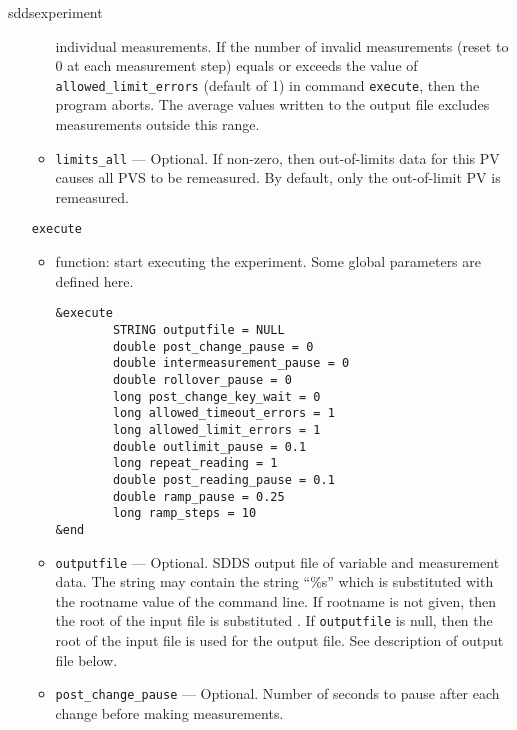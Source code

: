 \begin{sddsprog}{sddsexperiment}
\begin{itemize}
\begin{itemize}
                individual measurements. If the number of invalid measurements (reset to 0 at each
                measurement step) equals or exceeds the value
                of {\verb+allowed_limit_errors+} (default of 1) in command {\verb+execute+}, then the program aborts.
                The average values written to the output file excludes measurements outside this range.
        \item {\verb+limits_all+} --- Optional. If non-zero, then out-of-limits data for this PV causes 
                all PVS to be remeasured. By default, only the out-of-limit PV is remeasured.
\end{itemize}

\begin{latexonly}
\newpage\begin{center}{\Large \verb+execute+}\end{center}
\end{latexonly}
\begin{htmlonly}
\item {\Large \verb+execute+}
\end{htmlonly}
\begin{itemize}
        \item function: start executing the experiment. Some global parameters are defined here.
\begin{verbatim}
&execute
        STRING outputfile = NULL
        double post_change_pause = 0
        double intermeasurement_pause = 0
        double rollover_pause = 0
        long post_change_key_wait = 0
        long allowed_timeout_errors = 1
        long allowed_limit_errors = 1
        double outlimit_pause = 0.1
        long repeat_reading = 1
        double post_reading_pause = 0.1
        double ramp_pause = 0.25
        long ramp_steps = 10
&end
\end{verbatim}
        \item {\verb+outputfile+} --- Optional. SDDS output file of variable and measurement data. The string
                may contain the string ``\%s'' which is substituted with the rootname value
                of the command line. If rootname is not given, then the root of the input file
                is substituted . If {\verb+outputfile+} is null, then the root of the input file
                is used for the output file. See description of output file below.
        \item {\verb+post_change_pause+} ---  Optional. Number of seconds to pause after each change before
                making measurements.

\end{itemize}
\end{itemize}
\end{sddsprog}
